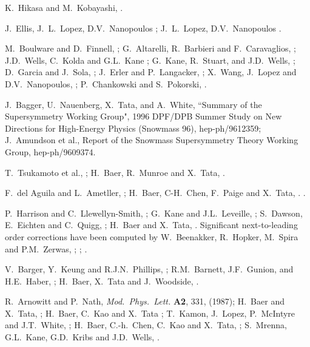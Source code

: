 \begin{thebibliography}{99}
 K.~Hikasa and M.~Kobayashi,
.

 J.~Ellis, J.~L.~Lopez, D.V.~Nanopoulos 
; J.~L.~Lopez, D.V.~Nanopoulos 
. 

 M.~Boulware and D.~Finnell, ;
G.~Altarelli, R.~Barbieri and F.~Caravaglios,
;
J.D.~Wells, C.~Kolda and G.L.~Kane ;
G.~Kane, R.~Stuart, and J.D.~Wells, ;
D.~Garcia and J.~Sola, ;
J.~Erler and P.~Langacker, ;
X.~Wang, J.~Lopez and D.V.~Nanopoulos,
;
P.~Chankowski and S.~Pokorski, .

 J.~Bagger, U.~Nauenberg, X.~Tata, and A.~White,
``Summary of the Supersymmetry Working Group",
1996 DPF/DPB Summer Study on New Directions for High-Energy Physics
(Snowmass 96), hep-ph/9612359; J.~Amundson et al., Report of
the Snowmass Supersymmetry Theory Working Group,  hep-ph/9609374.

 T.~Tsukamoto et al.,
;
H.~Baer, R.~Munroe and X.~Tata, .

 F.~del Aguila and L.~Ametller,
;
H.~Baer, C-H.~Chen, F.~Paige and X.~Tata, .
.

 P.~Harrison and C.~Llewellyn-Smith,
;
G.~Kane and J.L.~Leveille,
;
S.~Dawson, E.~Eichten and C.~Quigg,
;
H.~Baer and X.~Tata, .
Significant next-to-leading order corrections have
been computed by W.~Beenakker, R.~Hopker, M.~Spira and P.M.~Zerwas,
;
;
.

V.~Barger, Y.~Keung and R.J.N.~Phillips, ;
R.M.~Barnett, J.F.~Gunion, and H.E.~Haber, ;
H.~Baer, X.~Tata and J.~Woodside, .

 R.~Arnowitt and P.~Nath, {\em Mod.~Phys.~Lett.}
{\bf A2}, 331, (1987); H.~Baer and X.~Tata,
; H.~Baer, C.~Kao and X.~Tata
; T.~Kamon, J.~Lopez, P.~McIntyre and
J.T.~White, ;
H.~Baer, C.-h.~Chen, C.~Kao and X.~Tata, ;
S.~Mrenna, G.L.~Kane, G.D.~Kribs and J.D.~Wells,
.


\end{thebibliography}
